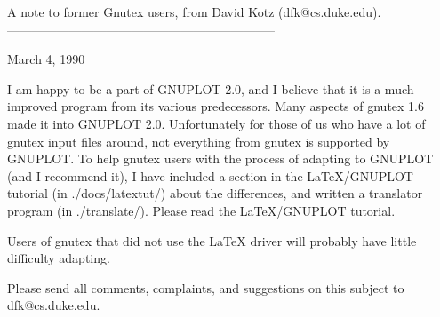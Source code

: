 A note to former Gnutex users, from David Kotz (dfk@cs.duke.edu).
-----------------------------------------------------------------

March 4, 1990

I am happy to be a part of GNUPLOT 2.0, and I believe that it is a
much improved program from its various predecessors. Many aspects of
gnutex 1.6 made it into GNUPLOT 2.0. Unfortunately for those of us who
have a lot of gnutex input files around, not everything from gnutex is
supported by GNUPLOT. To help gnutex users with the process of
adapting to GNUPLOT (and I recommend it), I have included a section in
the LaTeX/GNUPLOT tutorial (in ./docs/latextut/) about the
differences, and written a translator program (in ./translate/).
Please read the LaTeX/GNUPLOT tutorial.

Users of gnutex that did not use the LaTeX driver will probably have
little difficulty adapting. 

Please send all comments, complaints, and suggestions on this subject
to dfk@cs.duke.edu.
